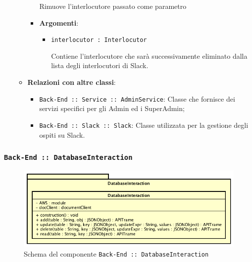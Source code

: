 \documentclass[../DefinizioneDiProdotto.tex]{subfiles}
\begin{document}
\begin{itemize}
\begin{itemize}
\begin{itemize}
	 Rimuove l'interlocutore passato come parametro

	\item \textbf{Argomenti}:
	\begin{itemize}
	\item \texttt{interlocutor : Interlocutor}\

	 Contiene l'interlocutore che sarà successivamente eliminato dalla lista degli interlocutori di Slack.
	\end{itemize}
	\end{itemize}\vspace{0.5em}
	\item \textbf{Relazioni con altre classi}:
	\begin{itemize}
	\item \texttt{Back-End :: Service :: AdminService}: Classe che fornisce dei servizi specifici per gli Admin ed i SuperAdmin;
	\item \texttt{Back-End :: Slack :: Slack}: Classe utilizzata per la gestione degli ospiti su Slack.
	\end{itemize}
	\end{itemize}\end{itemize}

	\newpage
	\subsubsection{ \texttt{Back-End :: DatabaseInteraction}}
	\begin{figure}[!h]
		\centering
		\includegraphics[scale=0.7]{Architettura/Back-End/DatabaseInteraction.png}
		\caption{Schema del componente \texttt{Back-End :: DatabaseInteraction}}
	\end{figure}
\end{document}
